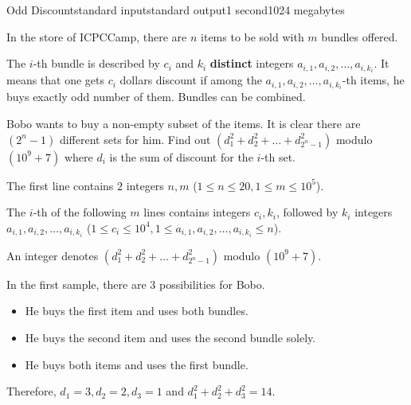 \begin{problem}{Odd Discount}{standard input}{standard output}{1 second}{1024 megabytes}

In the store of ICPCCamp, there are $n$ items to be sold with $m$ bundles offered.

The $i$-th bundle is described by $c_i$ and $k_i$ \textbf{distinct} integers $a_{i, 1}, a_{i, 2}, \dots, a_{i, k_i}$.
It means that one gets $c_i$ dollars discount if among the $a_{i, 1}, a_{i, 2}, \dots, a_{i, k_i}$-th items, he buys exactly odd number of them. Bundles can be combined.

Bobo wants to buy a non-empty subset of the items.
It is clear there are $(2^n - 1)$ different sets for him.
Find out $(d_1^2 + d_2^2 + \dots + d_{2^n - 1}^2)$ modulo $(10^9+7)$ where $d_i$ is the sum of discount for the $i$-th set.

\InputFile
The first line contains $2$ integers $n, m$ ($1 \leq n \leq 20, 1 \leq m \leq 10^5$). 

The $i$-th of the following $m$ lines contains integers $c_i, k_i$, followed by $k_i$ integers $a_{i, 1}, a_{i, 2}, \dots, a_{i, k_i}$ ($1 \leq c_i \leq 10^4, 1 \leq a_{i, 1}, a_{i, 2}, \dots, a_{i, k_i} \leq n$). 

\OutputFile
An integer denotes $(d_1^2+d_2^2+\dots+d_{2^n-1}^2)$ modulo $(10^9+7)$.

\Examples

\begin{example}
%
%
\end{example}

\Note
In the first sample, there are $3$ possibilities for Bobo.
\begin{itemize}
\item He buys the first item and uses both bundles.
\item He buys the second item and uses the second bundle solely.
\item He buys both items and uses the first bundle.
\end{itemize}

Therefore, $d_1 = 3, d_2 = 2, d_3 = 1$ and $d_1^2 + d_2^2 + d_3^2 = 14$.

\end{problem}

